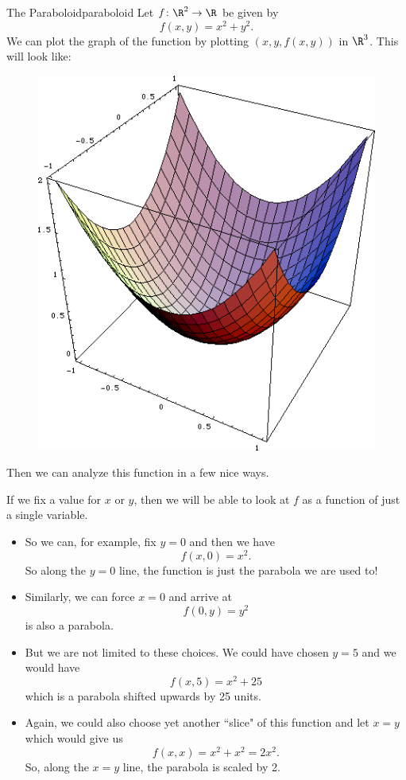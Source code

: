         \begin{ex}{The Paraboloid}{paraboloid}
        Let $f\colon \R^2 \to \R$ be given by
        \[
        f(x,y)=x^2+y^2.
        \]
        We can plot the graph of the function by plotting $(x,y, f(x,y))$ in $\R^3$.  This will look like:
        \begin{figure}[H]
            \centering
            \includegraphics[width=.4\textwidth]{Figures/paraboloid.png}
        \end{figure}
        Then we can analyze this function in a few nice ways.  
        
        If we fix a value for $x$ or $y$, then we will be able to look at $f$ as a function of just a single variable.  
        \begin{itemize}
        \item So we can, for example, fix $y=0$ and then we have
        \[
        f(x,0)=x^2.
        \]
        So along the $y=0$ line, the function is just the parabola we are used to! 
        
        \item Similarly, we can force $x=0$ and arrive at
        \[
        f(0,y)=y^2
        \]
        is also a parabola.  
        
        \item But we are not limited to these choices.  We could have chosen $y=5$ and we would have
        \[
        f(x,5)=x^2+25
        \]
        which is a parabola shifted upwards by 25 units.
        
        \item  Again, we could also choose yet another ``slice" of this function and let $x=y$ which would give us
        \[
        f(x,x)=x^2+x^2=2x^2.
        \]
        So, along the $x=y$ line, the parabola is scaled by 2.
        

\end{itemize}
\end{ex}

